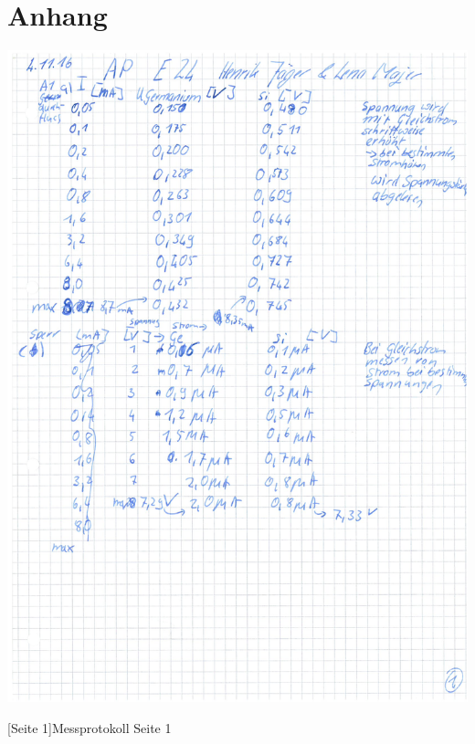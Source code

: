 \chapter{Anhang}
    	\begin{center}
    		\includegraphics[scale=0.65]{Daten/1_Seite_2.jpg}
    	\end{center}
    	[Seite 1]{Messprotokoll Seite 1}
    	\pagebreak
    	
